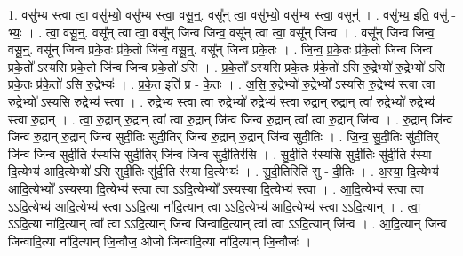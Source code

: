 \documentclass[17pt]{extarticle}
\begin{document}
1. वसु॑भ्य स्त्वा त्वा॒ वसु॑भ्यो॒ वसु॑भ्य स्त्वा॒ वसू॒न्॒. वसू᳚न् त्वा॒ वसु॑भ्यो॒ वसु॑भ्य स्त्वा॒ वसून्॑ । . वसु॑भ्य॒ इति॒ वसु॑ - भ्यः॒ । . त्वा॒ वसू॒न्॒. वसू᳚न् त्वा त्वा॒ वसू᳚न् जिन्व जिन्व॒ वसू᳚न् त्वा त्वा॒ वसू᳚न् जिन्व । . वसू᳚न् जिन्व जिन्व॒ वसू॒न्॒. वसू᳚न् जिन्व प्रके॒तः प्र॑के॒तो जि॑न्व॒ वसू॒न्॒. वसू᳚न् जिन्व प्रके॒तः । . जि॒न्व॒ प्र॒के॒तः प्र॑के॒तो जि॑न्व जिन्व प्रके॒तो᳚ ऽस्यसि प्रके॒तो जि॑न्व जिन्व प्रके॒तो॑ ऽसि । . प्र॒के॒तो᳚ ऽस्यसि प्रके॒तः प्र॑के॒तो॑ ऽसि रु॒द्रेभ्यो॑ रु॒द्रेभ्यो॑ ऽसि प्रके॒तः प्र॑के॒तो॑ ऽसि रु॒द्रेभ्यः॑ । . प्र॒के॒त इति॑ प्र - के॒तः । . अ॒सि॒ रु॒द्रेभ्यो॑ रु॒द्रेभ्यो᳚ ऽस्यसि रु॒द्रेभ्य॑ स्त्वा त्वा रु॒द्रेभ्यो᳚ ऽस्यसि रु॒द्रेभ्य॑ स्त्वा । . रु॒द्रेभ्य॑ स्त्वा त्वा रु॒द्रेभ्यो॑ रु॒द्रेभ्य॑ स्त्वा रु॒द्रान् रु॒द्रान् त्वा॑ रु॒द्रेभ्यो॑ रु॒द्रेभ्य॑ स्त्वा रु॒द्रान् । . त्वा॒ रु॒द्रान् रु॒द्रान् त्वा᳚ त्वा रु॒द्रान् जि॑न्व जिन्व रु॒द्रान् त्वा᳚ त्वा रु॒द्रान् जि॑न्व । . रु॒द्रान् जि॑न्व जिन्व रु॒द्रान् रु॒द्रान् जि॑न्व सुदी॒तिः सु॑दी॒तिर् जि॑न्व रु॒द्रान् रु॒द्रान् जि॑न्व सुदी॒तिः । . जि॒न्व॒ सु॒दी॒तिः सु॑दी॒तिर् जि॑न्व जिन्व सुदी॒ति र॑स्यसि सुदी॒तिर् जि॑न्व जिन्व सुदी॒तिर॑सि । . सु॒दी॒ति र॑स्यसि सुदी॒तिः सु॑दी॒ति र॑स्या दि॒त्येभ्य॑ आदि॒त्येभ्यो॑ ऽसि सुदी॒तिः सु॑दी॒ति र॑स्या दि॒त्येभ्यः॑ । . सु॒दी॒तिरिति॑ सु - दी॒तिः । . अ॒स्या॒ दि॒त्येभ्य॑ आदि॒त्येभ्यो᳚ ऽस्यस्या दि॒त्येभ्य॑ स्त्वा त्वा ऽऽदि॒त्येभ्यो᳚ ऽस्यस्या दि॒त्येभ्य॑ स्त्वा । . आ॒दि॒त्येभ्य॑ स्त्वा त्वा ऽऽदि॒त्येभ्य॑ आदि॒त्येभ्य॑ स्त्वा ऽऽदि॒त्या ना॑दि॒त्यान् त्वा॑ ऽऽदि॒त्येभ्य॑ आदि॒त्येभ्य॑ स्त्वा ऽऽदि॒त्यान् । . त्वा॒ ऽऽदि॒त्या ना॑दि॒त्यान् त्वा᳚ त्वा ऽऽदि॒त्यान् जि॑न्व जिन्वादि॒त्यान् त्वा᳚ त्वा ऽऽदि॒त्यान् जि॑न्व । . आ॒दि॒त्यान् जि॑न्व जिन्वादि॒त्या ना॑दि॒त्यान् जि॒न्वौज॒ ओजो॑ जिन्वादि॒त्या ना॑दि॒त्यान् जि॒न्वौजः॑ । \newline
\end{document}
